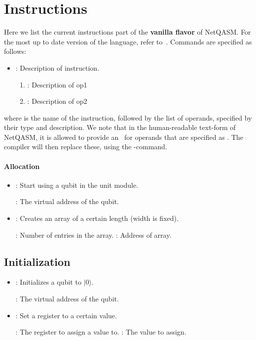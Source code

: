 \section{Instructions}
\label{app:instructions}
Here we list the current instructions part of the \textbf{vanilla flavor} of \ac{NetQASM}.
For the most up to date version of the language, refer to~\cite{git_netqasm}.
Commands are specified as follows:
\begin{itemize}
  \item {}: Description of instruction.
        \begin{enumerate}
          \item \IMMEDIATE : Description of op1
          \item \REGISTER : Description of op2
        \end{enumerate}
\end{itemize}

where  is the name of the instruction, followed by the list of operands, specified by their type and description.
We note that in the human-readable text-form of \ac{NetQASM}, it is allowed to provide an \IMMEDIATE\ for operands that are specified as \REGISTER.
The compiler will then replace these, using the -command.

\paragraph{Allocation}

\begin{itemize}
  \item {}: Start using a qubit in the unit module.

        : The virtual address of the qubit.
  \item {}: Creates an array of a certain length (width is fixed).

        : Number of entries in the array.
        : Address of array.
\end{itemize}


\subsection{Initialization}

\begin{itemize}
  \item {}: Initializes a qubit to $|0\rangle$.

        : The virtual address of the qubit.
  \item {}: Set a register to a certain value.

        : The register to assign a value to.
        : The value to assign.
\end{itemize}

